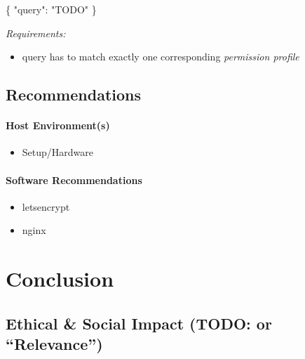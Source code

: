 \documentclass[12pt,english,a4paper,titlepage,cleardoublepage=empty,dottedtoc]{report}
\newenvironment{Shaded}{\begin{snugshade}}{\end{snugshade}}
\newcommand{\DataTypeTok}[1]{\textcolor[rgb]{0.13,0.29,0.53}{{#1}}}
\newcommand{\StringTok}[1]{\textcolor[rgb]{0.31,0.60,0.02}{{#1}}}
\newcommand{\FunctionTok}[1]{\textcolor[rgb]{0.00,0.00,0.00}{{#1}}}
\providecommand{\tightlist}{%
  \setlength{\itemsep}{0pt}\setlength{\parskip}{0pt}}
\begin{document}
\begin{Shaded}
\begin{Highlighting}[numbers=left,,]
\FunctionTok{\{}
    \DataTypeTok{"query"}\FunctionTok{:} \StringTok{"TODO"}
\FunctionTok{\}}
\end{Highlighting}
\end{Shaded}

\emph{Requirements:}

\begin{itemize}
\tightlist
\item
  query has to match exactly one corresponding \emph{permission profile}
\end{itemize}

\section{Recommendations}\label{recommendations}

\subsubsection{Host Environment(s)}\label{host-environments}

\begin{itemize}
\tightlist
\item
  Setup/Hardware
\end{itemize}

\subsubsection{Software Recommendations}\label{software-recommendations}

\begin{itemize}
\tightlist
\item
  letsencrypt
\item
  nginx
\end{itemize}

\chapter{Conclusion}\label{conclusion}

\section{\texorpdfstring{Ethical \& Social Impact (TODO: or
``Relevance'')}{Ethical \& Social Impact (TODO: or Relevance)}}\label{ethical-social-impact-todo-or-relevance}
\end{document}
